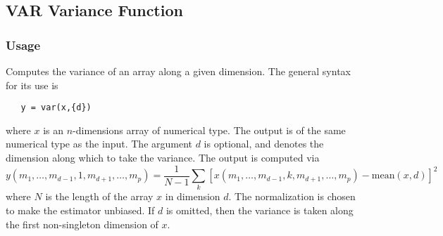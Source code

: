 %
%
%
\subsection{VAR Variance Function}
\subsubsection{Usage}
Computes the variance of an array along a given dimension.  The general
syntax for its use is
\begin{verbatim}
   y = var(x,{d})
\end{verbatim}
where $x$ is an $n$-dimensions array of numerical type.
The output is of the same numerical type as the input.  The argument
$d$ is optional, and denotes the dimension along which to take
the variance.  The output is computed via
\[
y(m_1,\ldots,m_{d-1},1,m_{d+1},\ldots,m_{p}) = \frac{1}{N-1}
\sum_{k} \left[ x(m_1,\ldots,m_{d-1},k,m_{d+1},\ldots,m_{p})
  - \mathrm{mean}(x,d) \right]^2
\]
where $N$ is the length of the array $x$ in dimension $d$.
The normalization is chosen to make the estimator unbiased.
If $d$ is omitted, then the variance is taken along the 
first non-singleton dimension of $x$. 
